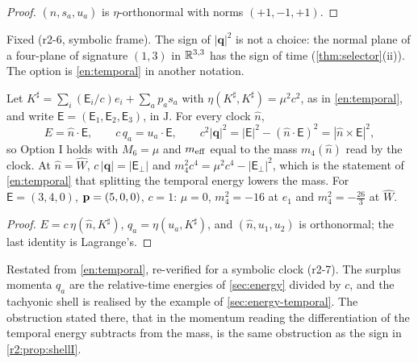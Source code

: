 \begin{proof}
$(\hat n,s_a,u_a)$ is $\eta$-orthonormal with norms $(+1,-1,+1)$.
\end{proof}

Fixed (r2-6, symbolic frame). The sign of $|\mathbf q|^2$ is not a choice: the normal plane of a
four-plane of signature $(1,3)$ in $\mathbb{R}^{3,3}$ has the sign of time (\cref{thm:selector}(ii)). The option is \cref{en:temporal} in another notation.

\begin{proposition}
\label{r2:prop:RE}
Let $K^\sharp=\sum_i(\mathsf E_i/c)e_i+\sum_ap_as_a$ with $\eta(K^\sharp,K^\sharp)=\mu^2c^2$, as in \cref{en:temporal}, and write
$\boldsymbol{\mathsf E}=(\mathsf E_1,\mathsf E_2,\mathsf E_3)$, in $\mathrm J$. For every clock $\hat n$,
\[
E=\hat n\cdot\boldsymbol{\mathsf E},\qquad c\,q_a=u_a\cdot\boldsymbol{\mathsf E},\qquad c^2|\mathbf q|^2=|\boldsymbol{\mathsf E}|^2-(\hat n\cdot\boldsymbol{\mathsf E})^2
=|\hat n\times\boldsymbol{\mathsf E}|^2,
\]
so Option I holds with $M_6=\mu$ and $m_{\rm eff}$ equal to the mass $m_4(\hat n)$ read by the clock. At $\hat n=\widehat W$, $c\,|\mathbf q|=|\boldsymbol{\mathsf E}_\perp|$
and $m_4^2c^4=\mu^2c^4-|\boldsymbol{\mathsf E}_\perp|^2$, which is the statement of \cref{en:temporal} that splitting the temporal energy lowers the mass. For
$\boldsymbol{\mathsf E}=(3,4,0)$, $\mathbf p=(5,0,0)$, $c=1$: $\mu=0$, $m_4^2=-16$ at $e_1$ and $m_4^2=-\tfrac{26}3$ at $\widehat W$.
\end{proposition}

\begin{proof}
$E=c\,\eta(\hat n,K^\sharp)$, $q_a=\eta(u_a,K^\sharp)$, and $(\hat n,u_1,u_2)$ is orthonormal; the last identity is Lagrange's.
\end{proof}

Restated from \cref{en:temporal}, re-verified for a symbolic clock (r2-7). The surplus momenta $q_a$ are the relative-time energies of \cref{sec:energy} divided by $c$, and the tachyonic shell is realised by the example of \cref{sec:energy-temporal}. The obstruction stated there, that in the momentum reading the
differentiation of the temporal energy subtracts from the mass, is the same obstruction as the sign in \cref{r2:prop:shellI}.

